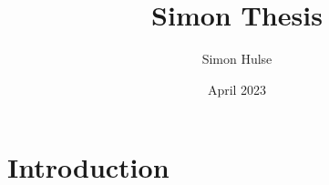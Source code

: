 \documentclass{article}
\title{Simon Thesis}
\author{Simon Hulse}
\date{April 2023}
\begin{document}
\maketitle

\section{Introduction}
\end{document}
